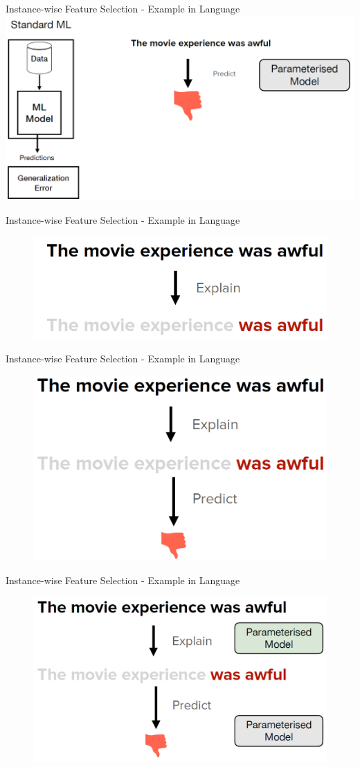 \documentclass[11pt,compress,t,notes=noshow, aspectratio=169, xcolor=table]{beamer}
\begin{document}
\begin{frame}{Instance-wise Feature Selection - Example in Language}
    \includegraphics[scale=.36, left]{bild7}
\end{frame}

\begin{frame}{Instance-wise Feature Selection - Example in Language}


    \begin{figure}
    \includegraphics[width=0.6\linewidth]{bild8}
    \end{figure}
\end{frame}

\begin{frame}{Instance-wise Feature Selection - Example in Language}
    \begin{figure}
    \includegraphics[width=0.6\linewidth]{bild9}
    \end{figure}
\end{frame}

\begin{frame}{Instance-wise Feature Selection - Example in Language}
    \begin{figure}
    \includegraphics[width=0.6\linewidth]{bild10}
    \end{figure}
\end{frame}
\end{document}
